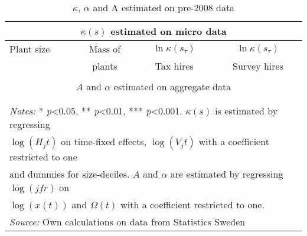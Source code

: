 \begin{table}[htbp]\centering
\def\sym#1{\ifmmode^{#1}\else\(^{#1}\)\fi}
\caption{$\kappa$, $\alpha$ and A estimated on pre-2008 data}
\label{table:estimating_kappa}
\begin{tabular}{lccc}
\hline \hline
 \multicolumn{4}{c}{$\kappa(s)$ estimated on micro data} \\
\hline \hline
       Plant size         & Mass of & $\ln \kappa (s_\tau)$ & $\ln \kappa (s_\tau)$ \\
			                    & plants& Tax hires          &Survey hires               \\
\hline

\hline 
 \\
\hline \hline
\multicolumn{4}{c}{$A$ and $\alpha$ estimated on aggregate data} \\
\hline \hline \\
 \\
\hline\hline 
\multicolumn{4}{l}{\footnotesize \emph{Notes:} * \emph{p}<0.05, ** \emph{p}<0.01, *** \emph{p}<0.001. $\kappa(s)$ is estimated by regressing}\\
\multicolumn{4}{l}{\footnotesize  $\log(H_jt)$ on time-fixed effects, $\log(V_jt)$ with a coefficient restricted to one} \\
\multicolumn{4}{l}{\footnotesize and dummies for size-deciles. $A$ and $\alpha$ are estimated by regressing $\log(jfr)$ on}\\
\multicolumn{4}{l}{\footnotesize  $\log(x(t))$ and $\Omega(t)$ with a coefficient restricted to one.}\\
\multicolumn{4}{l}{\footnotesize \emph{Source:} Own calculations on data from Statistics Sweden}
\end{tabular}
\end{table}